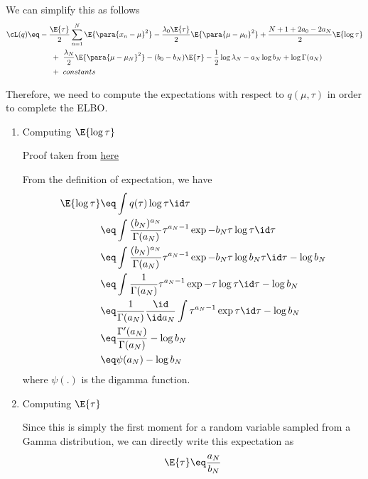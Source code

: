 \documentclass{article}
\begin{document}
\begin{question}
	We can simplify this as follows
	\begin{align*}
		\cL(q)	&\eq	- \frac{\E{\tau}}{2} \sum_{n = 1}^N \E{\para{x_n - \mu}^2} - \frac{\lambda_0 \E{\tau}}{2} \E{\para{\mu - \mu_0}^2} + \frac{N + 1 + 2 a_0 - 2 a_N}{2} \E{\log{\tau}} \\
		&\hspace{1.1cm} + \ \frac{\lambda_N}{2} \E{\para{\mu - \mu_N}^2} - (b_0 - b_N) \E{\tau} - \frac{1}{2} \log{\lambda_N} - a_N \log{b_N} + \log{\Gamma(a_N)} \\
		&\hspace{1.1cm} + \ constants
	\end{align*}

	Therefore, we need to compute the expectations with respect to $q(\mu, \tau)$ in order to complete the ELBO.
	\begin{enumerate}[label=\bt{\theenumi.}]
		\item Computing $\E{\log{\tau}}$

			\begin{note}
				Proof taken from \href{https://math.stackexchange.com/questions/138252/expected-value-of-ln-x-if-x-is-gammaa-b-distributed}{here}
			\end{note}

			From the definition of expectation, we have
			\begin{align*}
				\E{\log{\tau}}	&\eq	\int q(\tau) \log{\tau} \id \tau \\
				&\eq	\int \frac{(b_N)^{a_N}}{\Gamma(a_N)} \tau^{a_N - 1} \exp{- b_N \tau} \log{\tau} \id \tau \\
				&\eq	\int \frac{(b_N)^{a_N}}{\Gamma(a_N)} \tau^{a_N - 1} \exp{- b_N \tau} \log{b_N \tau} \id \tau - \log{b_N} \\
				&\eq	\int \frac{1}{\Gamma(a_N)} \tau^{a_N - 1} \exp{- \tau} \log{\tau} \id \tau - \log{b_N} \\
				&\eq	\frac{1}{\Gamma(a_N)} \frac{\id}{\id a_N} \int \tau^{a_N - 1} \exp{\tau} \id \tau - \log{b_N} \\
				&\eq	\frac{\Gamma'(a_N)}{\Gamma(a_N)} - \log{b_N} \\
				&\eq	\psi(a_N) - \log{b_N}
			\end{align*}
			where $\psi(.)$ is the digamma function.

		\item Computing $\E{\tau}$

			Since this is simply the first moment for a random variable sampled from a Gamma distribution, we can directly write this expectation as
			\begin{align*}
				\E{\tau}	\eq	\frac{a_N}{b_N}
			\end{align*}


\end{enumerate}
\end{question}
\end{document}
